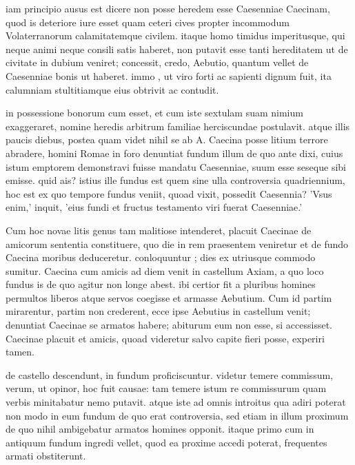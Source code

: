  iam principio ausus est dicere non posse heredem esse Caesenniae Caecinam, quod is deteriore iure esset quam ceteri cives propter incommodum Volaterranorum calamitatemque civilem. itaque homo timidus imperitusque, qui neque animi neque consili satis haberet, non putavit esse tanti hereditatem ut de civitate in dubium veniret; concessit, credo, Aebutio, quantum vellet de Caesenniae bonis ut haberet. immo , ut viro forti ac sapienti dignum fuit, ita calumniam stultitiamque eius obtrivit ac contudit.

 in possessione bonorum cum esset, et cum iste sextulam suam nimium exaggeraret, nomine heredis arbitrum familiae herciscundae postulavit. atque illis paucis diebus, postea quam videt nihil se ab A. Caecina posse litium terrore abradere, homini Romae in foro denuntiat fundum illum de quo ante dixi, cuius istum emptorem demonstravi fuisse mandatu Caesenniae, suum esse seseque sibi emisse. quid ais? istius ille fundus est quem sine ulla controversia quadriennium, hoc est ex quo tempore fundus veniit, quoad vixit, possedit Caesennia? 'Vsus enim,' inquit, 'eius fundi et fructus testamento viri fuerat Caesenniae.'

 Cum hoc novae litis genus tam malitiose intenderet, placuit Caecinae de amicorum sententia constituere, quo die in rem praesentem veniretur et de fundo Caecina moribus deduceretur. conloquuntur ; dies ex utriusque commodo sumitur. Caecina cum amicis ad diem venit in castellum Axiam, a quo loco fundus is de quo agitur non longe abest. ibi certior fit a pluribus homines permultos liberos atque servos coegisse et armasse Aebutium. Cum id partim mirarentur, partim non crederent, ecce ipse Aebutius in castellum venit; denuntiat Caecinae se armatos habere; abiturum eum non esse, si accessisset. Caecinae placuit et amicis, quoad videretur salvo capite fieri posse, experiri tamen.

 de castello descendunt, in fundum proficiscuntur. videtur temere commissum, verum, ut opinor, hoc fuit causae: tam temere istum re commissurum quam verbis minitabatur nemo putavit. atque iste ad omnis introitus qua adiri poterat non modo in eum fundum de quo erat controversia, sed etiam in illum proximum de quo nihil ambigebatur armatos homines opponit. itaque primo cum in antiquum fundum ingredi vellet, quod ea proxime accedi poterat, frequentes armati obstiterunt.

